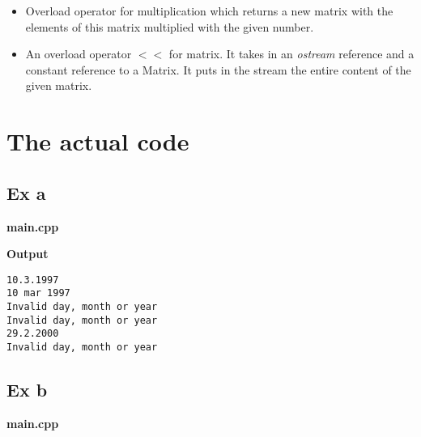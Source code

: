 \documentclass{article}
\begin{document}
\begin{itemize}
				\item {}
					\par Overload operator for multiplication which returns a new matrix with the elements of this matrix multiplied with the given number.

				\item {}
					\par An overload operator \textit{$<<$} for matrix. It takes in an \textit{ostream} reference and a constant reference to a Matrix. It puts in the stream the entire content of the given matrix.
			\end{itemize}

			\pagebreak

	\section{The actual code}
		\subsection{Ex a}
			

			\begin{minipage}{\textwidth}
				\begin{center}
					\textbf{main.cpp}
				\end{center}

				
			\end{minipage}

			\begin{minipage}{\textwidth}
				\begin{center}
					\textbf{Output}
				\end{center}

				\begin{lstlisting}
10.3.1997
10 mar 1997
Invalid day, month or year
Invalid day, month or year
29.2.2000
Invalid day, month or year
				\end{lstlisting}
			\end{minipage}
			\pagebreak

		\subsection{Ex b}
			
			
			\begin{minipage}{\textwidth}
				\begin{center}
					\textbf{main.cpp}
				\end{center}

				
			\end{minipage}
\end{document}
